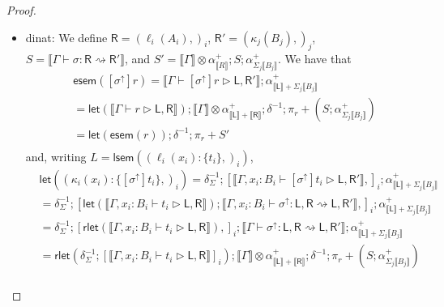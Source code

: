 \documentclass[acmsmall,screen,review]{acmart}
\newcommand{\ms}[1]{\ensuremath{\mathsf{#1}}}
\newcommand{\lto}{:}
\newcommand{\wbranch}[3]{#1(#2) \lto \{#3\}}
\newcommand{\upg}[1]{{#1}^\uparrow}
\newcommand{\bhyp}[2]{#1 : #2}
\newcommand{\haslb}[3]{#1 \vdash #2 \rhd #3}
\newcommand{\lbsubst}[4]{#1 \vdash #2: #3 \rightsquigarrow #4}
\newcommand{\brle}[1]{{\textsf{#1}}}
\newcommand{\dnt}[1]{\llbracket{#1}\rrbracket}
\newcommand{\entrymor}[1]{\ms{esem}(#1)}
\newcommand{\loopmor}[1]{\ms{lsem}(#1)}
\newcommand{\lmor}[1]{\ms{let}(#1)}
\newcommand{\rlmor}[1]{\ms{rlet}(#1)}
\begin{document}
\begin{proof}
\begin{itemize}[leftmargin=*]
    \item \brle{dinat}: 
    We define 
      $\ms{R} = (\ell_i(A_i),)_i$, $\ms{R}' = (\kappa_j(B_j),)_j$, %
      $S = \dnt{\lbsubst{\Gamma}{\sigma}{\ms{R}}{\ms{R}'}}$, and %
      $S' = \dnt{\Gamma} \otimes \alpha^+_{\dnt{R}} ; S ; \alpha^+_{\Sigma_j\dnt{B_j}}$. %
    We have that
    \begin{equation}
      \begin{aligned}
        & \entrymor{[\upg{\sigma}]r}
          = \dnt{\haslb{\Gamma}{[\upg{\sigma}]r}{\ms{L}, \ms{R}'}}
          ; \alpha^+_{\dnt{\ms{L}} + \Sigma_j \dnt{B_j}} \\
        & = \lmor{\dnt{\haslb{\Gamma}{r}{\ms{L}, \ms{R}}}}
          ; \dnt{\Gamma} \otimes \alpha^+_{\dnt{\ms{L}} + \dnt{\ms{R}}}
          ; \delta^{-1}
          ; \pi_r 
            + (S ; \alpha^+_{\Sigma_j\dnt{B_j}}) \\
        & = \lmor{\entrymor{r}} ; \delta^{-1} ; \pi_r + S' \\
      \end{aligned}
    \end{equation}
    and, writing $L = \loopmor{(\wbranch{\ell_i}{x_i}{t_i},)_i}$,
    \begin{equation}
      \begin{aligned}
        & \lmor{(\wbranch{\kappa_i}{x_i}{[\upg{\sigma}]t_i},)_i}
          = \delta^{-1}_\Sigma
          ; [ \dnt{\haslb{\Gamma, \bhyp{x_i}{B_i}}{[\upg{\sigma}]t_i}{\ms{L}, \ms{R}'}}, ]_i
          ; \alpha^+_{\dnt{\ms{L}} + \Sigma_j \dnt{B_j}} \\
        & = \delta^{-1}_\Sigma
          ; [ \lmor{\dnt{\haslb{\Gamma, \bhyp{x_i}{B_i}}{t_i}{\ms{L}, \ms{R}}}} 
            ; \dnt{\lbsubst{\Gamma, \bhyp{x_i}{B_i}}
                    {\upg{\sigma}}{\ms{L}, \ms{R}}{\ms{L}, \ms{R}'}},
          ]_i
          ; \alpha^+_{\dnt{\ms{L}} + \Sigma_j \dnt{B_j}} \\
        & = \delta^{-1}_\Sigma
          ; [ \rlmor{\dnt{\haslb{\Gamma, \bhyp{x_i}{B_i}}{t_i}{\ms{L}, \ms{R}}}},
          ]_i
          ; \dnt{\lbsubst{\Gamma}{\upg{\sigma}}{\ms{L}, \ms{R}}{\ms{L}, \ms{R}'}}
          ; \alpha^+_{\dnt{\ms{L}} + \Sigma_j \dnt{B_j}} \\
        & = \rlmor{\delta^{-1}_\Sigma
          ; [ \dnt{\haslb{\Gamma, \bhyp{x_i}{B_i}}{t_i}{\ms{L}, \ms{R}}}
          ]_i}
          ; \dnt{\Gamma} \otimes \alpha^+_{\dnt{\ms{L}} + \dnt{\ms{R}}}
          ; \delta^{-1}
          ; \pi_r + (
            S ; \alpha^+_{\Sigma_j\dnt{B_j}}
          )
           \\

\end{aligned}
\end{equation}
\end{itemize}
\end{proof}
\end{document}
